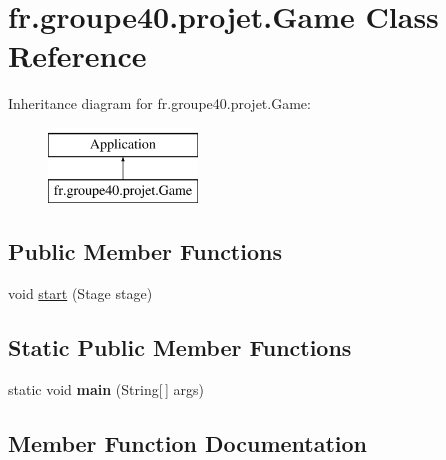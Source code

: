 \hypertarget{classfr_1_1groupe40_1_1projet_1_1_game}{}\section{fr.\+groupe40.\+projet.\+Game Class Reference}
\label{classfr_1_1groupe40_1_1projet_1_1_game}
Inheritance diagram for fr.\+groupe40.\+projet.\+Game\+:\begin{figure}[H]
\begin{center}
\leavevmode
\includegraphics[height=2.000000cm]{classfr_1_1groupe40_1_1projet_1_1_game}
\end{center}
\end{figure}
\subsection*{Public Member Functions}
\begin{DoxyCompactItemize}
\item 
void \mbox{\hyperlink{classfr_1_1groupe40_1_1projet_1_1_game_a3700e488ecfb4fe5ff34bda5cb82b414}{start}} (Stage stage)
\end{DoxyCompactItemize}
\subsection*{Static Public Member Functions}
\begin{DoxyCompactItemize}
\item 
\mbox{\label{classfr_1_1groupe40_1_1projet_1_1_game_a690e2c3a3122844e099ac0dd3c2f60d7}} 
static void {\bfseries main} (String\mbox{[}$\,$\mbox{]} args)
\end{DoxyCompactItemize}


\subsection{Member Function Documentation}
\mbox{\label{classfr_1_1groupe40_1_1projet_1_1_game_a3700e488ecfb4fe5ff34bda5cb82b414}} 
